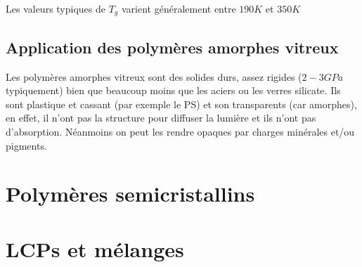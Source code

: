 \documentclass[../main.tex]{subfiles}
\begin{document}
	Les valeurs typiques de $T_g$ varient généralement entre $190K$ et $350K$
	\subsection{Application des polymères amorphes vitreux}
	Les polymères amorphes vitreux sont des solides durs, assez rigides ($2-3GPa$ typiquement) bien que beaucoup moins que les aciers ou les verres silicate. Ils sont plastique et cassant (par exemple le PS) et son transparents (car amorphes), en effet, il n'ont pas la structure pour diffuser la lumière et ils n'ont pas d'absorption. Néanmoins on peut les rendre opaques par charges minérales et/ou pigments.
	\section{Polymères semicristallins}
	\section{LCPs et mélanges}
\end{document}
